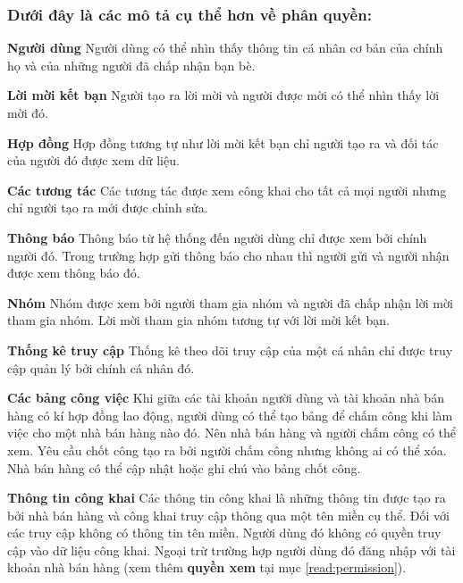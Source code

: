 \documentclass[11pt]{report}
\begin{document}
	
	\subsubsection{Dưới đây là các mô tả cụ thể hơn về phân quyền:}
	
	\textbf{Người dùng} Người dùng có thể nhìn thấy thông tin cá nhân cơ bản của chính họ và của những người đã chấp nhận bạn bè.
	
	\textbf{Lời mời kết bạn} Người tạo ra lời mời và người được mời có thể nhìn thấy lời mời đó.
	
	\textbf{Hợp đồng} Hợp đồng tương tự như lời mời kết bạn chỉ người tạo ra và đối tác của người đó được xem dữ liệu.
	
	\textbf{Các tương tác} Các tương tác được xem công khai cho tất cả mọi người nhưng chỉ người tạo ra mới được chỉnh sửa.
	
	\textbf{Thông báo} Thông báo từ hệ thống đến người dùng chỉ được xem bởi chính người đó. Trong trường hợp gửi thông báo cho nhau thì người gửi và người nhận được xem thông báo đó.
	
	\textbf{Nhóm} Nhóm được xem bởi người tham gia nhóm và người đã chấp nhận lời mời tham gia nhóm. Lời mời tham gia nhóm tương tự với lời mời kết bạn.
	
	\textbf{Thống kê truy cập} Thống kê theo dõi truy cập của một cá nhân chỉ được truy cập quản lý bởi chính cá nhân đó.
	
	\textbf{Các bảng công việc} Khi giữa các tài khoản người dùng và tài khoản nhà bán hàng có kí hợp đồng lao động, người dùng có thể tạo bảng để chấm công khi làm việc cho một nhà bán hàng nào đó. Nên nhà bán hàng và người chấm công có thể xem. Yêu cầu chốt công tạo ra bởi người chấm công nhưng không ai có thể xóa. Nhà bán hàng có thể cập nhật hoặc ghi chú vào bảng chốt công.
	
	\textbf{Thông tin công khai} Các thông tin công khai là những thông tin được tạo ra bởi nhà bán hàng và công khai truy cập thông qua một tên miền cụ thể. Đối với các truy cập không có thông tin tên miền. Người dùng đó không có quyền truy cập vào dữ liệu công khai. Ngoại trừ trường hợp người dùng đó đăng nhập với tài khoản nhà bán hàng (xem thêm \textbf{quyền xem} tại mục \ref{read:permission}).
	
\end{document}
